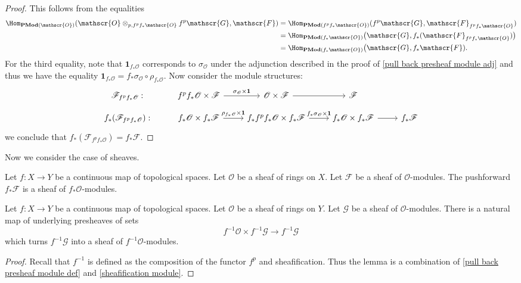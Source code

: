\begin{proof}
This follows from the equalities
\begin{align*}
\Hom_{\mathbf{PMod}(\mathscr{O})}(\mathscr{O}\otimes_{p,f^pf_*\mathscr{O}}f^p\mathscr{G},\mathscr{F})&=\Hom_{\mathbf{PMod}(f^pf_*\mathscr{O})}(f^p\mathscr{G},\mathscr{F}_{f^pf_*\mathscr{O}})\\
&=\Hom_{\mathbf{PMod}(f_*\mathscr{O})}\big(\mathscr{G},f_*(\mathscr{F}_{f^pf_*\mathscr{O}})\big)\\
&=\Hom_{\mathbf{PMod}(f_*\mathscr{O})}\big(\mathscr{G},f_*\mathscr{F}).
\end{align*}
For the third equality, note that $\mathbf{1}_{f_*\mathscr{O}}$ corresponds to $\sigma_{\mathscr{O}}$ under the adjunction described in the proof of \cref{pull back presheaf module adj} and thus we have the equality $\mathbf{1}_{f_*\mathscr{O}}=f_*\sigma_{\mathscr{O}}\circ\rho_{f_*\mathscr{O}}$. Now consider the module structures:
\[\begin{tikzcd}[row sep=small]
\mathscr{F}_{f^pf_*\mathscr{O}}:&f^pf_*\mathscr{O}\times\mathscr{F}\ar[r,"\sigma_{\mathscr{O}}\times\mathbf{1}"]&\mathscr{O}\times\mathscr{F}\ar[r]&\mathscr{F}\\
f_*(\mathscr{F}_{f^pf_*\mathscr{O}}):&f_*\mathscr{O}\times f_*\mathscr{F}\ar[r,"\rho_{f_*\mathscr{O}}\times\mathbf{1}"]&f_*f^pf_*\mathscr{O}\times f_*\mathscr{F}\ar[r,"f_*\sigma_{\mathscr{O}}\times\mathbf{1}"]&f_*\mathscr{O}\times f_*\mathscr{F}\ar[r]&f_*\mathscr{F}
\end{tikzcd}\]
we conclude that $f_*(\mathscr{F}_{f^pf_*\mathscr{O}})=f_*\mathscr{F}$.
\end{proof}
Now we consider the case of sheaves.
\begin{lemma}\label{pushforward sheaf module def}
Let $f:X\to Y$ be a continuous map of topological spaces. Let $\mathscr{O}$ be a sheaf of rings on $X$. Let $\mathscr{F}$ be a sheaf of $\mathscr{O}$-modules. The pushforward $f_*\mathscr{F}$ is a sheaf of $f_*\mathscr{O}$-modules.
\end{lemma}
\begin{lemma}\label{pull back module def}
Let $f:X\to Y$ be a continuous map of topological spaces. Let $\mathscr{O}$ be a sheaf of rings on $Y$. Let $\mathscr{G}$ be a sheaf of $\mathscr{O}$-modules. There is a natural map of underlying presheaves of sets
\[f^{-1}\mathscr{O}\times f^{-1}\mathscr{G}\to f^{-1}\mathscr{G}\]
which turns $f^{-1}\mathscr{G}$ into a sheaf of $f^{-1}\mathscr{O}$-modules.
\end{lemma}
\begin{proof}
Recall that $f^{-1}$ is defined as the composition of the functor $f^p$ and sheafification. Thus the lemma is a combination of \cref{pull back presheaf module def} and \cref{sheafification module}.
\end{proof}
